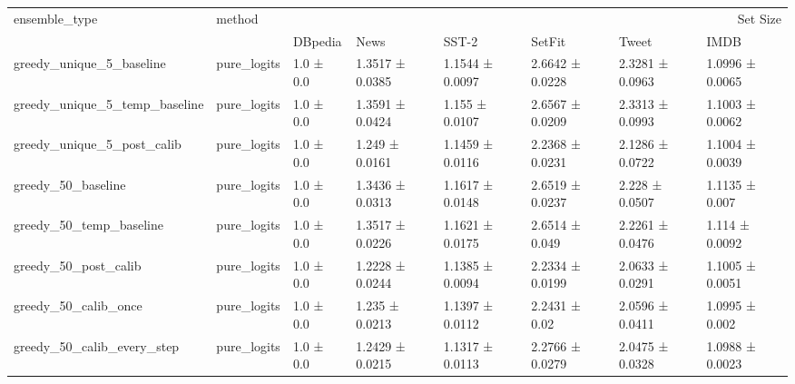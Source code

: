 \begin{tabular}{llllllll}
\toprule
ensemble_type & method & \multicolumn{6}{r}{Set Size} \\
 &  & DBpedia & News & SST-2 & SetFit & Tweet & IMDB \\
\midrule
greedy_unique_5_baseline & pure_logits & 1.0 ± 0.0 & 1.3517 ± 0.0385 & 1.1544 ± 0.0097 & 2.6642 ± 0.0228 & 2.3281 ± 0.0963 & 1.0996 ± 0.0065 \\
greedy_unique_5_temp_baseline & pure_logits & 1.0 ± 0.0 & 1.3591 ± 0.0424 & 1.155 ± 0.0107 & 2.6567 ± 0.0209 & 2.3313 ± 0.0993 & 1.1003 ± 0.0062 \\
greedy_unique_5_post_calib & pure_logits & 1.0 ± 0.0 & 1.249 ± 0.0161 & 1.1459 ± 0.0116 & 2.2368 ± 0.0231 & 2.1286 ± 0.0722 & 1.1004 ± 0.0039 \\
greedy_50_baseline & pure_logits & 1.0 ± 0.0 & 1.3436 ± 0.0313 & 1.1617 ± 0.0148 & 2.6519 ± 0.0237 & 2.228 ± 0.0507 & 1.1135 ± 0.007 \\
greedy_50_temp_baseline & pure_logits & 1.0 ± 0.0 & 1.3517 ± 0.0226 & 1.1621 ± 0.0175 & 2.6514 ± 0.049 & 2.2261 ± 0.0476 & 1.114 ± 0.0092 \\
greedy_50_post_calib & pure_logits & 1.0 ± 0.0 & 1.2228 ± 0.0244 & 1.1385 ± 0.0094 & 2.2334 ± 0.0199 & 2.0633 ± 0.0291 & 1.1005 ± 0.0051 \\
greedy_50_calib_once & pure_logits & 1.0 ± 0.0 & 1.235 ± 0.0213 & 1.1397 ± 0.0112 & 2.2431 ± 0.02 & 2.0596 ± 0.0411 & 1.0995 ± 0.002 \\
greedy_50_calib_every_step & pure_logits & 1.0 ± 0.0 & 1.2429 ± 0.0215 & 1.1317 ± 0.0113 & 2.2766 ± 0.0279 & 2.0475 ± 0.0328 & 1.0988 ± 0.0023 \\
\bottomrule
\end{tabular}

